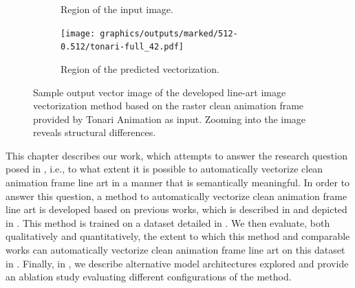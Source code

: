 \begin{figure}
\begin{subfigure}{.45\textwidth}
        \caption{Region of the input image.}
        \label{fig:tonari-42.input.zoom}
    \end{subfigure}
    \begin{subfigure}{.45\textwidth}
        \texttt{[image: graphics/outputs/marked/512-0.512/tonari-full\_42.pdf]}
        \caption{Region of the predicted vectorization.}
        \label{fig:tonari-42-output.zoom}
    \end{subfigure}
    \caption{Sample output vector image of the developed line-art image vectorization method based on the raster clean animation frame provided by Tonari Animation as input. Zooming into the image reveals structural differences.}
    \label{fig:input.output.example}
\end{figure}

This chapter describes our work, which attempts to answer the research question posed in , i.e., to what extent it is possible to automatically
vectorize clean animation frame line art in a manner that is semantically meaningful. In order to answer this question, a method to automatically vectorize clean animation frame line art is developed based on previous works, which is described in  and depicted in . This method is trained on a dataset detailed in . We then evaluate, both qualitatively and quantitatively, the extent to which this method and comparable works can automatically vectorize clean animation frame line art on this dataset in . Finally, in , we describe alternative model architectures explored and provide an ablation study evaluating different configurations of the method.

